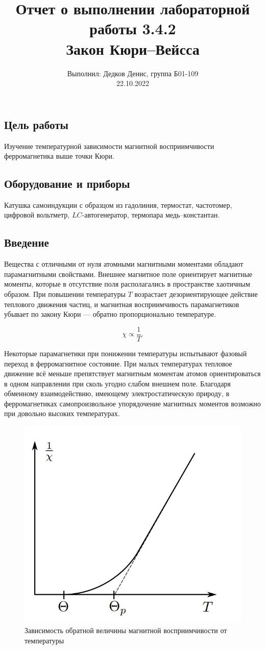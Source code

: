 \documentclass[12pt,a4paper]{article}
\author{\normalsize Выполнил: Дедков Денис, группа Б01-109 \\
	\normalsize 22.10.2022}
\date{}
\title{
	\large Отчет о выполнении лабораторной работы 3.4.2 \\
	\Large Закон Кюри–Вейсса \\ 
	
}
\begin{document}
\maketitle
\subsection*{Цель работы} Изучение температурной зависимости магнитной восприимчивости ферромагнетика выше точки Кюри.
\subsection*{Оборудование и приборы} Катушка самоиндукции с образцом из гадолиния, термостат, частотомер, цифровой вольтметр, $LC$-автогенератор, термопара медь–константан.

\subsection*{Введение}
Вещества с отличными от нуля атомными магнитными моментами
обладают парамагнитными свойствами. Внешнее магнитное поле ориентирует магнитные моменты, которые в отсутствие поля располагались в пространстве хаотичным образом. При повышении температуры $T$ возрастает дезориентирующее действие теплового движения частиц, и магнитная восприимчивость парамагнетиков убывает по закону Кюри — обратно пропорционально температуре.

$$\chi \propto \frac{1}{T}.$$

Некоторые парамагнетики при понижении температуры испытывают фазовый переход в ферромагнитное состояние. При малых температурах тепловое движение всё меньше препятствует магнитным моментам атомов ориентироваться в одном направлении при
сколь угодно слабом внешнем поле. Благодаря обменному взаимодействию, имеющему электростатическую природу, в ферромагнетиках самопроизвольное упорядочение магнитных моментов возможно при довольно высоких температурах.

\begin{figure}[H]
	\centering
	\includegraphics[width=0.5\linewidth]{"res/fig-chi_T.jpg"}
	\caption{Зависимость обратной величины магнитной восприимчивости от температуры}
	\label{fig:chi_T}
\end{figure}
\end{document}
